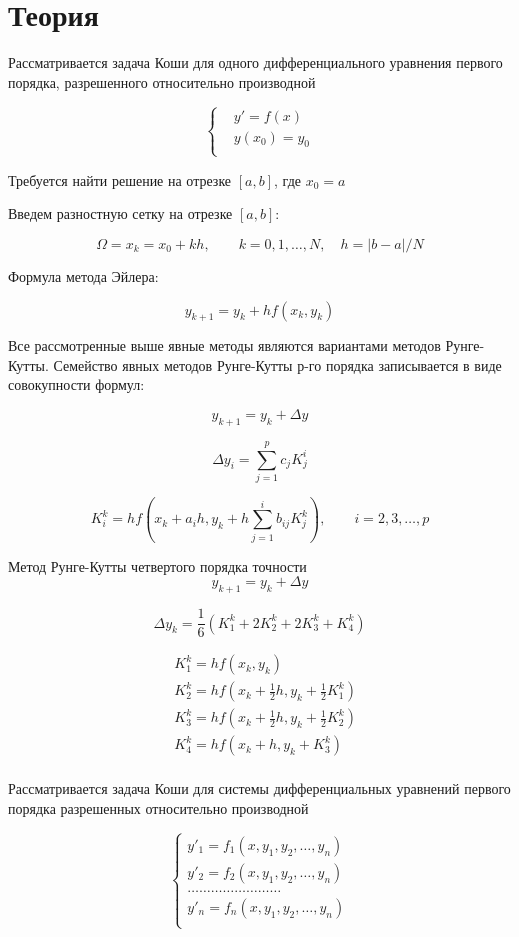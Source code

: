 \section*{Теория}

Рассматривается задача Коши для одного дифференциального уравнения
первого порядка, разрешенного относительно производной

$$\left\{\begin{aligned}
    & y' = f(x) \\
    & y(x_0) = y_0 \\
\end{aligned}\right.$$

Требуется найти решение на отрезке $[a,b]$, где $x_0 = a$

Введем разностную сетку на отрезке $[a, b]$:

$$\Omega = {x_k = x_0 + kh}, \qquad k = 0,1,\dots,N,\quad h = |b-a|/N$$

Формула метода Эйлера:

$$y_{k+1} = y_k + hf(x_k,y_k)$$

Все рассмотренные выше явные методы являются вариантами методов
Рунге-Кутты. Семейство явных методов Рунге-Кутты р-го порядка
записывается в виде совокупности формул:

$$y_{k+1} = y_k + \Delta y$$

$$\Delta y_i = \sum_{j=1}^p c_j K_j^i$$

$$K_i^k = hf\left(x_k + a_ih,
        y_k + h\sum_{j=1}^i b_{ij} K^k_j\right),
        \qquad i = 2,3,\dots,p $$

Метод Рунге-Кутты четвертого порядка точности
$$y_{k+1} = y_k + \Delta y$$

$$\Delta y_k = \frac{1}{6}(K_1^k + 2K_2^k + 2K_3^k + K_4^k)$$

$$\begin{aligned}
    & K_1^k = hf\left(x_k, y_k\right) \\
    & K_2^k = hf\left(x_k + \frac{1}{2}h, y_k + \frac{1}{2}K_1^k\right) \\
    & K_3^k = hf\left(x_k + \frac{1}{2}h, y_k + \frac{1}{2}K_2^k\right) \\
    & K_4^k = hf\left(x_k + h, y_k + K_3^k\right) \\
\end{aligned}$$

Рассматривается задача Коши для системы дифференциальных уравнений
первого порядка разрешенных относительно производной

$$\begin{cases}
    y'_1 = f_1(x, y_1, y_2, \dots, y_n) \\
    y'_2 = f_2(x, y_1, y_2, \dots, y_n) \\
    \dots\dots\dots\dots\dots\dots\dots\hdots \\
    y'_n = f_n(x, y_1, y_2, \dots, y_n) \\
\end{cases}$$

